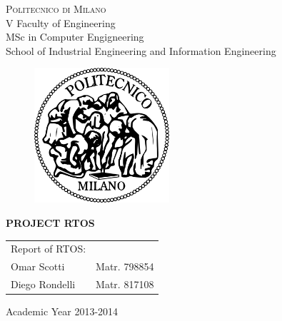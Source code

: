\documentclass[a4paper,12pt,oneside]{report}
\newlength{\defbaselineskip}
\newcommand{\setlinespacing}[1]%
           {\setlength{\baselineskip}{#1 \defbaselineskip}}
\begin{document}
\thispagestyle{empty}
\enlargethispage{60mm}
\begin{center}
\Large{\textsc{Politecnico di Milano}}\\
\large{V Faculty of Engineering}\\
\large{MSc in Computer Engigneering}\\
\large{School of Industrial Engineering and Information Engineering}\\
\vspace{30mm}
\begin{figure}[h]
\begin{center}
\includegraphics[width=50mm]{images/logo_poli.png}
\end{center}
\end{figure}
\vspace{15mm}

\begin{LARGE}
\textbf{PROJECT RTOS}
\end{LARGE}
\vspace{30mm}

\begin{flushright}
\begin{tabular}{l l }
Report of RTOS: & \\
Omar Scotti & Matr. 798854 \\
Diego Rondelli & Matr. 817108\\
\end{tabular}
\end{flushright}
\vspace{30mm}
{\large{Academic Year 2013-2014}}
\end{center}

\clearpage
\newpage

\setlinespacing{1.5}


\tableofcontents
\newpage
\clearpage

\listoffigures
\clearpage

\pagestyle{fancy} 
\headsep=40pt 
\lhead{} 
\rhead{\slshape \leftmark} 
\cfoot{\thepage}
\end{document}

